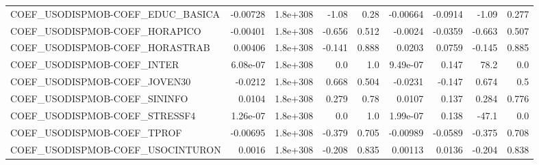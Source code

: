 \begin{tabular}{lrrrrrrrr}
COEF\_USODISPMOB-COEF\_EDUC\_BASICA  &    -0.00728 &     1.8e+308 &   -1.08 &     0.28 &   -0.00664 &     -0.0914 &        -1.09 &         0.277 \\
COEF\_USODISPMOB-COEF\_HORAPICO     &    -0.00401 &     1.8e+308 &  -0.656 &    0.512 &    -0.0024 &     -0.0359 &       -0.663 &         0.507 \\
COEF\_USODISPMOB-COEF\_HORASTRAB    &     0.00406 &     1.8e+308 &  -0.141 &    0.888 &     0.0203 &      0.0759 &       -0.145 &         0.885 \\
COEF\_USODISPMOB-COEF\_INTER        &    6.08e-07 &     1.8e+308 &     0.0 &      1.0 &   9.49e-07 &       0.147 &         78.2 &           0.0 \\
COEF\_USODISPMOB-COEF\_JOVEN30      &     -0.0212 &     1.8e+308 &   0.668 &    0.504 &    -0.0231 &      -0.147 &        0.674 &           0.5 \\
COEF\_USODISPMOB-COEF\_SININFO      &      0.0104 &     1.8e+308 &   0.279 &     0.78 &     0.0107 &       0.137 &        0.284 &         0.776 \\
COEF\_USODISPMOB-COEF\_STRESSF4     &    1.26e-07 &     1.8e+308 &     0.0 &      1.0 &   1.99e-07 &       0.138 &        -47.1 &           0.0 \\
COEF\_USODISPMOB-COEF\_TPROF        &    -0.00695 &     1.8e+308 &  -0.379 &    0.705 &   -0.00989 &     -0.0589 &       -0.375 &         0.708 \\
COEF\_USODISPMOB-COEF\_USOCINTURON  &      0.0016 &     1.8e+308 &  -0.208 &    0.835 &    0.00113 &      0.0136 &       -0.204 &         0.838 \\
\bottomrule
\end{tabular}
